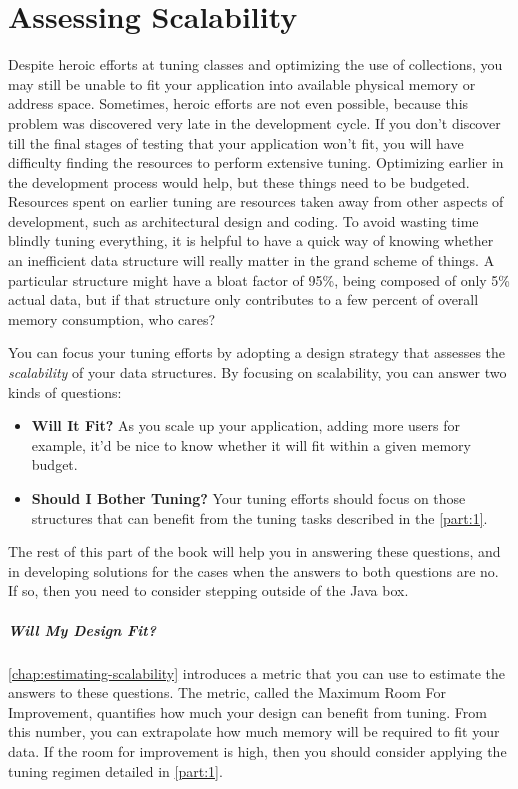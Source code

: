 \chapter{Assessing Scalability}

Despite heroic efforts at tuning classes and optimizing the use of collections,
you may still be unable to fit your application into available physical memory
or address space. Sometimes, heroic efforts are not even possible, because this
problem was discovered very late in the development cycle. If you don't discover
till the final stages of testing that your application won't fit, you will have
difficulty finding the resources to perform extensive tuning. Optimizing earlier
in the development process would help, but these things need to be budgeted.
Resources spent on earlier tuning are resources taken away from other aspects of
development, such as architectural design and coding. To avoid wasting time
blindly tuning everything, it is helpful to have a quick way of knowing whether
an inefficient data structure will really matter in the grand scheme of things.
A particular structure might have a bloat factor of 95\%, being composed of only
5\% actual data, but if that structure only contributes to a few percent of
overall memory consumption, who cares?

You can focus your tuning efforts by adopting a design strategy that assesses
the \emph{scalability} of your data structures. By focusing on scalability, you
can answer two kinds of questions:

\begin{itemize}
  \item \textbf{Will It Fit?} As you scale up your application, adding more
  users for example, it'd be nice to know whether it will fit
  within a given memory budget. 
  \item \textbf{Should I Bother Tuning?} Your tuning efforts should focus 
on those structures that can benefit from the tuning tasks described in
the \autoref{part:1}. 
\end{itemize}

The rest of this part of the book will help you in answering these
questions, and in developing solutions for the cases when the answers to both
questions are no. If so, then you need to consider stepping outside of the Java
box.

\paragraph{Will My Design Fit?}
\autoref{chap:estimating-scalability} introduces a metric that you can use to
estimate the answers to these questions. The metric, called the  Maximum Room
For Improvement, quantifies how much your design can benefit from tuning. From
this number, you can extrapolate how much memory will be required to fit your
data. If the room for improvement is high, then you should consider
applying the tuning regimen detailed in \autoref{part:1}.

